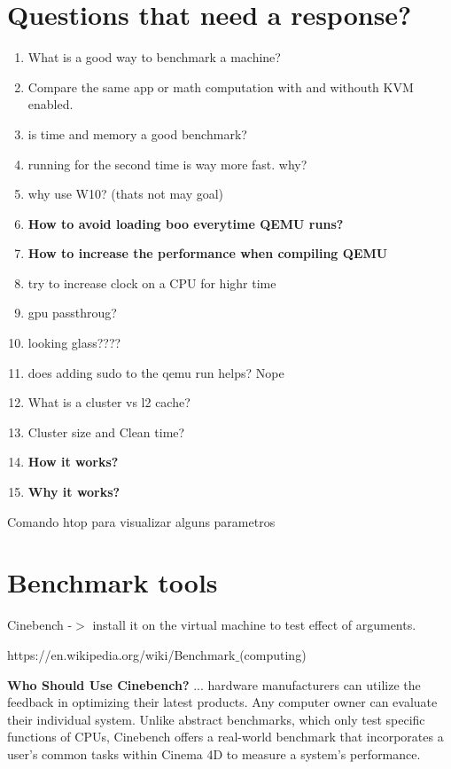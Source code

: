 \documentclass[11pt, a4paper, oneside]{article}
\theoremstyle{definition}
\begin{document}
\vfill
\pagebreak
\section{Questions that need a response?}
\begin{enumerate}
	\item What is a good way to benchmark a machine?
	\item Compare the same app or math computation with and withouth KVM enabled.
	\item is time and memory a good benchmark?
	\item running for the second time is way more fast. why?
	\item why use W10? (thats not may goal)
	\item \textbf{How to avoid loading boo everytime QEMU runs?}
	\item \textbf{How to increase the performance when compiling QEMU}
	\item try to increase clock on a CPU for highr time
	\item gpu passthroug?
	\item looking glass????
	\item does adding sudo to the qemu run helps? Nope
	\item What is a cluster vs l2 cache?
	\item Cluster size and Clean time?
	\item \textbf{How it works?}
	\item \textbf{Why it works?}
\end{enumerate}

Comando htop para visualizar alguns parametros
\vfill
\pagebreak
\section{Benchmark tools}
Cinebench -$>$ install it on the virtual machine to test effect of arguments.

https://en.wikipedia.org/wiki/Benchmark$\_$(computing)

\textbf{Who Should Use Cinebench? }
... hardware manufacturers can utilize the feedback in optimizing their latest products. Any computer owner can evaluate their individual system. Unlike abstract benchmarks, which only test specific functions of CPUs, Cinebench offers a real-world benchmark that incorporates a user's common tasks within Cinema 4D to measure a system's performance.\\
\end{document}
